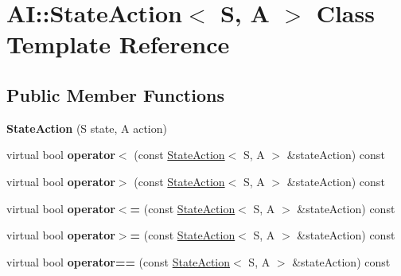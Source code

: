 \hypertarget{classAI_1_1StateAction}{\section{A\-I\-:\-:State\-Action$<$ S, A $>$ Class Template Reference}
\label{classAI_1_1StateAction}
}
\subsection*{Public Member Functions}
\begin{DoxyCompactItemize}
\item 
\hypertarget{classAI_1_1StateAction_ad2a25a219a6941a2e36b0783dd6c01cf}{{\bfseries State\-Action} (S state, A action)}\label{classAI_1_1StateAction_ad2a25a219a6941a2e36b0783dd6c01cf}

\item 
\hypertarget{classAI_1_1StateAction_a8ba71340cc0993a198d9648ab7df8af8}{virtual bool {\bfseries operator$<$} (const \hyperlink{classAI_1_1StateAction}{State\-Action}$<$ S, A $>$ \&state\-Action) const }\label{classAI_1_1StateAction_a8ba71340cc0993a198d9648ab7df8af8}

\item 
\hypertarget{classAI_1_1StateAction_acc9bfdfd11ea817bc8b478bbd0496f96}{virtual bool {\bfseries operator$>$} (const \hyperlink{classAI_1_1StateAction}{State\-Action}$<$ S, A $>$ \&state\-Action) const }\label{classAI_1_1StateAction_acc9bfdfd11ea817bc8b478bbd0496f96}

\item 
\hypertarget{classAI_1_1StateAction_a1cddf0ba056f1be7be3f0a65d2ea7a1b}{virtual bool {\bfseries operator$<$=} (const \hyperlink{classAI_1_1StateAction}{State\-Action}$<$ S, A $>$ \&state\-Action) const }\label{classAI_1_1StateAction_a1cddf0ba056f1be7be3f0a65d2ea7a1b}

\item 
\hypertarget{classAI_1_1StateAction_a86027cd4244a8913e2b109aabe3191d4}{virtual bool {\bfseries operator$>$=} (const \hyperlink{classAI_1_1StateAction}{State\-Action}$<$ S, A $>$ \&state\-Action) const }\label{classAI_1_1StateAction_a86027cd4244a8913e2b109aabe3191d4}

\item 
\hypertarget{classAI_1_1StateAction_acb219388dc6b7a94b10ae95125b9f7b1}{virtual bool {\bfseries operator==} (const \hyperlink{classAI_1_1StateAction}{State\-Action}$<$ S, A $>$ \&state\-Action) const }\label{classAI_1_1StateAction_acb219388dc6b7a94b10ae95125b9f7b1}


\end{DoxyCompactItemize}
